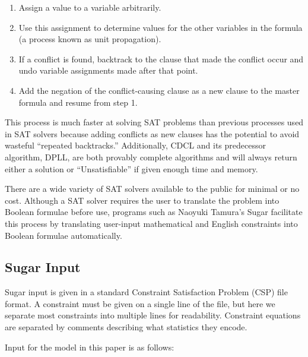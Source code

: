 \documentclass[runningheads]{llncs}
\begin{document}
\begin{enumerate}

\item Assign a value to a variable arbitrarily.
\item Use this assignment to determine values for the other variables
  in the formula (a process known as unit propagation).
\item If a conflict is found, backtrack to the clause that made the
  conflict occur and undo variable assignments made after that point.
\item Add the negation of the conflict-causing clause as a new clause
  to the master formula and resume from step 1.

\end{enumerate}

This process is much faster at solving SAT problems than previous
processes used in SAT solvers because adding conflicts as new clauses
has the potential to avoid wasteful ``repeated backtracks.''
Additionally, CDCL and its predecessor algorithm, DPLL, are both
provably complete algorithms and will always return either a solution
or ``Unsatisfiable'' if given enough time and memory.

There are a wide variety of SAT solvers available to the public for
minimal or no cost. Although a SAT solver requires the user to
translate the problem into Boolean formulae before use, programs such
as Naoyuki Tamura's Sugar facilitate this process by translating
user-input mathematical and English constraints into Boolean formulae
automatically.

\subsection{Sugar Input}

Sugar input is given in a standard Constraint Satisfaction Problem
(CSP) file format. A constraint must be given on a single line of the
file, but here we separate most constraints into multiple lines for
readability. Constraint equations are separated by comments describing
what statistics they encode.

Input for the model in this paper is as follows:


\end{document}
